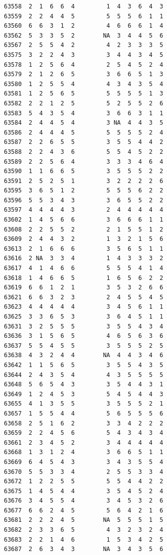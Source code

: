 \documentclass[
  letterpaper,
  DIV=11,
  numbers=noendperiod]{scrreprt}
\begin{document}
\begin{verbatim}
63558  2  1  6  6  4         1  4  3  6  4  3
63559  2  2  4  4  5         5  5  5  6  1  1
63560  6  6  3  1  2         4  6  6  6  1  4
63562  5  3  3  5  2        NA  3  4  4  5  6
63567  2  5  5  4  2         4  2  3  3  3  5
63575  3  2  2  4  3         3  4  4  3  4  5
63578  1  2  5  6  4         2  5  4  5  2  4
63579  2  1  2  6  5         3  6  6  5  1  3
63580  1  2  5  5  4         4  3  4  3  5  4
63581  1  2  5  6  5         5  5  5  5  1  3
63582  2  2  1  2  5         5  2  5  5  2  6
63583  5  4  3  5  4         3  6  6  3  1  1
63584  2  4  4  5  4         3 NA  4  4  3  5
63586  2  4  4  4  5         5  5  5  5  2  4
63587  2  2  6  5  5         3  5  5  4  4  2
63588  2  2  4  3  6         5  5  4  5  2  2
63589  2  2  5  6  4         3  3  3  4  6  4
63590  1  1  6  6  5         3  5  5  5  2  2
63591  2  5  2  5  1         3  2  2  2  2  6
63595  3  6  5  1  2         5  5  5  6  2  2
63596  5  5  3  4  3         3  6  5  5  2  2
63597  4  4  4  4  3         2  4  4  4  4  4
63602  1  4  5  6  6         3  6  6  6  1  1
63608  2  2  5  5  2         2  1  5  5  1  2
63609  2  4  4  3  2         1  3  2  1  5  6
63613  2  1  6  6  6         3  5  6  5  1  1
63616  2 NA  3  3  4         1  4  3  3  3  2
63617  4  1  4  6  6         5  5  5  4  1  4
63618  1  4  6  6  5         1  6  5  6  2  2
63619  6  6  1  2  1         3  5  3  2  6  6
63621  6  6  3  2  3         2  4  5  5  4  5
63623  4  4  4  4  4         3  4  5  6  1  1
63625  3  3  6  5  3         3  6  4  5  1  1
63631  3  2  5  5  5         3  5  5  4  3  4
63636  3  1  5  6  5         4  6  5  6  3  6
63637  5  5  4  5  5         3  5  5  5  2  5
63638  4  3  2  4  4        NA  4  4  3  4  6
63642  1  1  5  6  5         3  5  5  4  3  5
63644  2  4  3  5  4         4  3  5  5  5  5
63648  5  6  5  4  3         3  5  4  4  3  1
63649  1  2  4  5  3         5  4  5  4  4  3
63655  4  1  3  5  5         3  5  5  5  2  1
63657  1  5  5  4  4         5  6  5  5  5  6
63658  2  5  1  6  2         3  3  4  2  2  2
63659  2  2  4  5  6         5  4  3  4  3  4
63661  2  3  4  5  2         3  4  4  4  4  4
63668  1  3  1  2  4         3  6  6  5  1  1
63669  6  4  5  4  3         3  4  3  5  5  4
63670  5  5  3  3  4         2  5  5  3  3  4
63672  1  2  2  5  5         5  5  4  4  2  2
63675  1  4  5  4  4         3  5  4  5  2  4
63676  3  4  5  5  4         3  4  5  3  2  6
63677  6  6  2  4  5         5  6  4  2  1  6
63681  2  2  2  4  5        NA  5  5  5  1  5
63682  2  3  3  6  5         4  3  2  3  2  4
63683  2  2  1  4  6         1  5  3  4  2  5
63687  2  6  3  4  3        NA  3  4  3  5  6

\end{verbatim}
\end{document}
